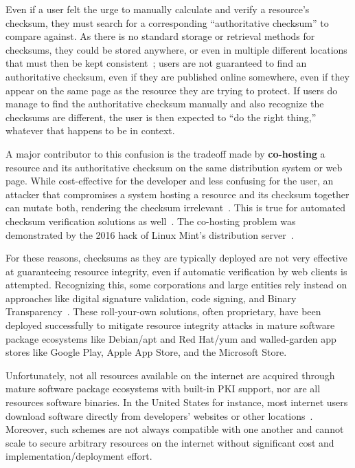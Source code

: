 Even if a user felt the urge to manually calculate and verify a resource's
checksum, they must search for a corresponding ``authoritative checksum'' to
compare against. As there is no standard storage or retrieval methods for
checksums, they could be stored anywhere, or even in multiple different
locations that must then be kept consistent~\cite{Cherubini}; users are not
guaranteed to find an authoritative checksum, even if they are published online
somewhere, even if they appear on the same page as the resource they are trying
to protect. If users do manage to find the authoritative checksum manually and
also recognize the checksums are different, the user is then expected to ``do
the right thing,'' whatever that happens to be in context.

A major contributor to this confusion is the tradeoff made by
\textbf{co-hosting} a resource and its authoritative checksum on the same
distribution system or web page. While cost-effective for the developer and less
confusing for the user, an attacker that compromises a system hosting a resource
and its checksum together can mutate both, rendering the checksum
irrelevant~\cite{Stickler}. This is true for automated checksum verification
solutions as well~\cite{Cherubini}. The co-hosting problem was demonstrated by
the 2016 hack of Linux Mint's distribution server~\cite{SCA-MINT1, SCA-MINT2}.

For these reasons, checksums as they are typically deployed are not very
effective at guaranteeing resource integrity, even if automatic verification by
web clients is attempted. Recognizing this, some corporations and large entities
rely instead on approaches like digital signature validation, code signing, and
Binary Transparency~\cite{PKI, BinaryTransparency}. These roll-your-own
solutions, often proprietary, have been deployed successfully to mitigate
resource integrity attacks in mature software package ecosystems like Debian/apt
and Red Hat/yum and walled-garden app stores like Google Play, Apple App Store,
and the Microsoft Store.

Unfortunately, not all resources available on the internet are acquired through
mature software package ecosystems with built-in PKI support, nor are all
resources software binaries. In the United States for instance, most internet
users download software directly from developers' websites or other
locations~\cite{Cherubini, File}. Moreover, such schemes are not always
compatible with one another and cannot scale to secure arbitrary resources on
the internet without significant cost and implementation/deployment effort.

